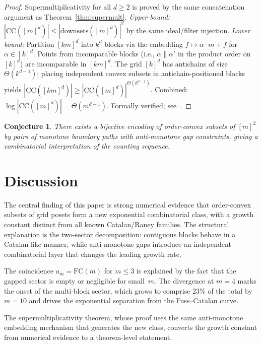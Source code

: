 \documentclass[11pt,a4paper]{article}
\theoremstyle{plain}
\newtheorem{conjecture}[theorem]{Conjecture}
\theoremstyle{definition}
\theoremstyle{remark}
\newcommand{\CC}{\mathrm{CC}}
\begin{document}
\begin{proof}
Supermultiplicativity for all $d \geq 2$ is proved by the same concatenation argument as Theorem~\ref{thm:supermult}.
\emph{Upper bound:} $|\CC([m]^d)| \leq |\mathrm{downsets}([m]^d)|^2$ by the same ideal/filter injection.
\emph{Lower bound:} Partition $[km]^d$ into $k^d$ blocks via the embedding $f \mapsto \alpha \cdot m + f$ for $\alpha \in [k]^d$.
Points from incomparable blocks (i.e., $\alpha \| \alpha'$ in the product order on $[k]^d$) are incomparable in $[km]^d$.
The grid $[k]^d$ has antichains of size $\Theta(k^{d-1})$; placing independent convex subsets in antichain-positioned blocks yields $|\CC([km]^d)| \geq |\CC([m]^d)|^{\Theta(k^{d-1})}$.
Combined: $\log|\CC([m]^d)| = \Theta(m^{d-1})$.
Formally verified; see~\cite{leanrepo}.
\end{proof}

\begin{conjecture}\label{conj:bijection}
There exists a bijective encoding of order-convex subsets of $[m]^2$ by pairs of monotone boundary paths with anti-monotone gap constraints, giving a combinatorial interpretation of the counting sequence.
\end{conjecture}


\section{Discussion}\label{sec:discussion}

The central finding of this paper is strong numerical evidence that order-convex subsets of grid posets form a new exponential combinatorial class, with a growth constant distinct from all known Catalan/Raney families.
The structural explanation is the two-sector decomposition: contiguous blocks behave in a Catalan-like manner, while anti-monotone gaps introduce an independent combinatorial layer that changes the leading growth rate.

The coincidence $a_m = \mathrm{FC}(m)$ for $m \leq 3$ is explained by the fact that the gapped sector is empty or negligible for small~$m$.
The divergence at $m = 4$ marks the onset of the multi-block sector, which grows to comprise $23\%$ of the total by $m = 10$ and drives the exponential separation from the Fuss--Catalan curve.

The supermultiplicativity theorem, whose proof uses the same anti-monotone embedding mechanism that generates the new class, converts the growth constant from numerical evidence to a theorem-level statement.
\end{document}
